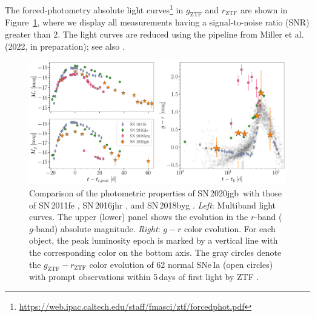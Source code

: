 \documentclass[twocolumn]{aastex631}
\newcommand{\sn}{SN\,2020jgb}
\begin{document}
The forced-photometry absolute light curves\footnote{\url{https://web.ipac.caltech.edu/staff/fmasci/ztf/forcedphot.pdf}} in $g_\mathrm{ZTF}$ and $r_\mathrm{ZTF}$ are shown in Figure~\ref{fig:photometry}, where we display all measurements having a signal-to-noise ratio (SNR) greater than 2. The light curves are reduced using the pipeline from Miller et al. (2022, in preparation); see also \citet{Yao_2019}.

\begin{figure}
    \centering
    \includegraphics[width=\textwidth]{photometry.pdf}
    \caption{Comparison of the photometric properties of \sn\ with those of SN\,2011fe \citep[normal SN\,Ia;][]{Pereira_2013}, SN\,2016jhr \citep[normal-luminosity He-shell DDet;][]{jiang_16jhr_2017}, and SN\,2018byg \citep[subluminous He-shell DDet;][]{de_18byg_2019}. \textit{Left}: Multiband light curves. The upper (lower) panel shows the evolution in the $r$-band ($g$-band) absolute magnitude. \textit{Right}: $g-r$ color evolution. For each object, the peak luminosity epoch is marked by a vertical line with the corresponding color on the bottom axis. The gray circles denote the $g_\mathrm{ZTF}-r_\mathrm{ZTF}$ color evolution of 62 normal SNe\,Ia (open circles) with prompt observations within 5\,days of first light by ZTF \citep{Bulla2020}. }
    \label{fig:photometry}
\end{figure}
\end{document}
